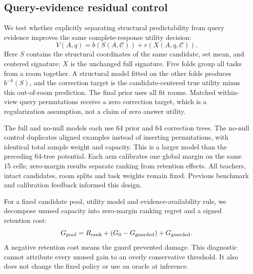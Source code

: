 \subsection{Query-evidence residual control}
We test whether explicitly separating structural predictability from query
evidence improves the same complete-response utility decision:
\begin{equation}
 V(A,q)=b(S(A,\mathcal C))+r(X(A,q,\mathcal C)).
\end{equation}
Here $S$ contains the structural coordinates of the same candidate, set mean,
and centered signature; $X$ is the unchanged full signature. Five folds group
all tasks from a room together. A structural model fitted on the other folds
produces $b^{-k}(S)$, and the correction target is the candidate-centered true
utility minus this out-of-room prediction. The final prior uses all fit rooms.
Matched within-view query permutations receive a zero correction target,
which is a regularization assumption, not a claim of zero answer utility.

The full and no-null models each use 64 prior and 64 correction trees. The
no-null control duplicates aligned examples instead of inserting permutations,
with identical total sample weight and capacity. This is a larger model than
the preceding 64-tree potential. Each arm calibrates one global margin on the
same 15 cells; zero-margin results separate ranking from retention effects.
All teachers, intact candidates, room splits and task weights remain fixed.
Previous benchmark and calibration feedback informed this design.

\begin{table}[ht]
\centering\small
\resizebox{\linewidth}{!}{}
\caption{Residual-utility control on the complete category/instance cohort
(\%). Unregularized is the matched no-null control, not a different teacher or
candidate pool. All five policies are sealed before fresh scoring.}
\end{table}


For a fixed candidate pool, utility model and evidence-availability rule, we
decompose unused capacity into zero-margin ranking regret and a signed
retention cost:
\begin{equation}
 G_{\rm pool}=R_{\rm rank}+(G_{0}-G_{\rm guarded})+G_{\rm guarded}.
\end{equation}
A negative retention cost means the guard prevented damage. This diagnostic
cannot attribute every unused gain to an overly conservative threshold. It
also does not change the fixed policy or use an oracle at inference.
